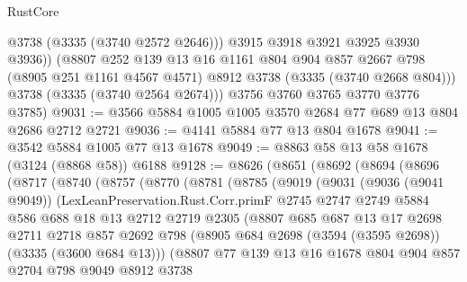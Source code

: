 \begin{lexlean}{RustCore}
\begin{coremodule}
              @3738
              (@3335 (@3740 @2572 @2646)))
            @3915
            @3918
            @3921
            @3925
            @3930
            @3936))
        (@8807
          @252
          @139
          @13
          @16
          @1161
          @804
          @904
          @857
          @2667
          @798
          (@8905 @251 @1161 @4567 @4571)
          @8912
          @3738
          (@3335 (@3740 @2668 @804)))
        @3738
        (@3335 (@3740 @2564 @2674)))
      @3756
      @3760
      @3765
      @3770
      @3776
      @3785)
@9031 := @3566 @5884 @1005 @1005 @3570 @2684 @77 @689 @13 @804 @2686 @2712 @2721
@9036 := @4141 @5884 @77 @13 @804 @1678
@9041 := @3542 @5884 @1005 @77 @13 @1678
@9049 := @8863 @58 @13 @58 @1678 (@3124 (@8868 @58)) @6188
@9128 := @8626
    (@8651
      (@8692
        (@8694
          (@8696
            (@8717
              (@8740
                (@8757
                  (@8770
                    (@8781
                      (@8785
                        (@9019
                          (@9031
                            (@9036 (@9041 @9049))
                            (LexLeanPreservation.Rust.Corr.primF
                              @2745
                              @2747
                              @2749
                              @5884
                              @586
                              @688
                              @18
                              @13
                              @2712
                              @2719
                              @2305
                              (@8807
                                @685
                                @687
                                @13
                                @17
                                @2698
                                @2711
                                @2718
                                @857
                                @2692
                                @798
                                (@8905 @684 @2698 (@3594 (@3595 @2698)) (@3335 (@3600 @684 @13)))
                                (@8807
                                  @77
                                  @139
                                  @13
                                  @16
                                  @1678
                                  @804
                                  @904
                                  @857
                                  @2704
                                  @798
                                  @9049
                                  @8912
                                  @3738

\end{coremodule}
\end{lexlean}
